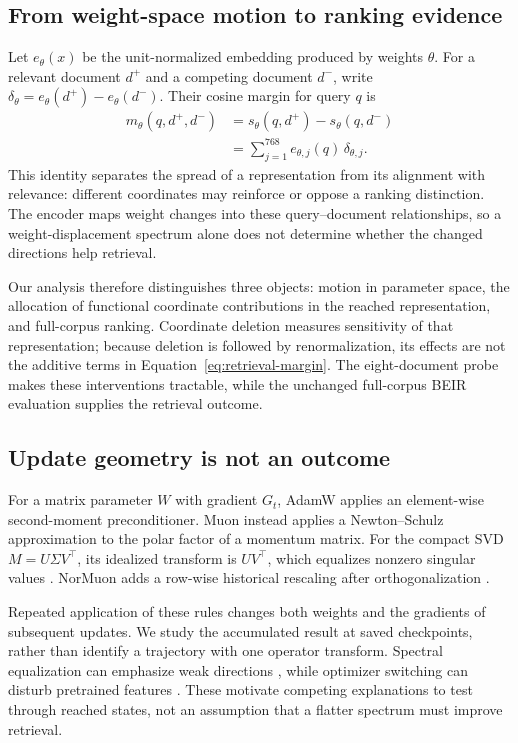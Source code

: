 \documentclass[11pt]{article}
\begin{document}
\subsection{From weight-space motion to ranking evidence}

Let $e_\theta(x)$ be the unit-normalized embedding produced by weights $\theta$.
For a relevant document $d^+$ and a competing document $d^-$, write
$\delta_\theta=e_\theta(d^+)-e_\theta(d^-)$. Their cosine margin for query $q$ is
\begin{align}
m_\theta(q,d^+,d^-)
&=s_\theta(q,d^+)-s_\theta(q,d^-) \nonumber\\
&=\sum_{j=1}^{768} e_{\theta,j}(q)\,\delta_{\theta,j}.
\label{eq:retrieval-margin}
\end{align}
This identity separates the spread of a representation from its alignment with relevance:
different coordinates may reinforce or oppose a ranking distinction. The encoder maps weight
changes into these query--document relationships, so a weight-displacement spectrum alone does
not determine whether the changed directions help retrieval.

Our analysis therefore distinguishes three objects: motion in parameter space, the allocation of
functional coordinate contributions in the reached representation, and full-corpus ranking.
Coordinate deletion measures sensitivity of that representation; because deletion is followed by
renormalization, its effects are not the additive terms in Equation~\ref{eq:retrieval-margin}.
The eight-document probe makes these interventions tractable, while the unchanged full-corpus
BEIR evaluation supplies the retrieval outcome.

\subsection{Update geometry is not an outcome}

For a matrix parameter $W$ with gradient $G_t$, AdamW applies an element-wise second-moment
preconditioner. Muon instead applies a Newton--Schulz approximation to the polar factor of a momentum
matrix. For the compact SVD $M=U\Sigma V^\top$, its idealized transform is $UV^\top$, which equalizes
nonzero singular values \citep{jordan2024muon}. NorMuon adds a row-wise historical rescaling after
orthogonalization \citep{li2025normuon}.

Repeated application of these rules changes both weights and the gradients of subsequent updates.
We study the accumulated result at saved checkpoints, rather than identify a trajectory with one
operator transform. Spectral equalization can emphasize weak directions
\citep{pang2026htmuon}, while optimizer switching can disturb pretrained features
\citep{qu2026finetune}. These motivate competing explanations to test through reached states,
not an assumption that a flatter spectrum must improve retrieval.
\end{document}

